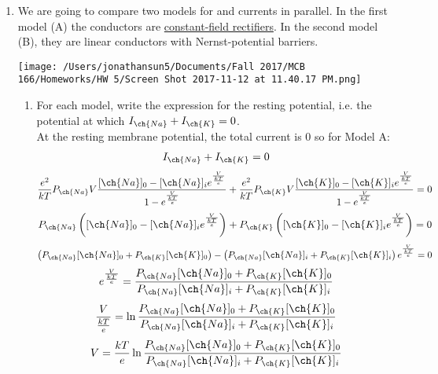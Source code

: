 \documentclass[11pt]{article}
\begin{document}
\begin{enumerate}[label=\arabic*.]
\newpage
\item
We are going to compare two models for  and  currents in parallel. In the first model (A) the conductors are \underline{constant-field rectifiers}. In the second model (B), they are linear conductors with Nernst-potential barriers.
\begin{center}
\texttt{[image: /Users/jonathansun5/Documents/Fall 2017/MCB 166/Homeworks/HW 5/Screen Shot 2017-11-12 at 11.40.17 PM.png]}
\end{center}
\begin{enumerate}[label=(\alph*)]
\item
For each model, write the expression for the resting potential, i.e. the potential at which $I_{\ch{Na}} + I_{\ch{K}} = 0$.
\vspace*{1\baselineskip}
\\
At the resting membrane potential, the total current is $0$ so for Model A:
\begin{align*}
I_{\ch{Na}} + I_{\ch{K}} = 0
\end{align*}
\begin{align*}
\frac{e^2} {kT} P_{\ch{Na}} V \frac{[\ch{Na}]_0 - [\ch{Na}]_i e^{\frac{V} {\frac{kT} {e}}}} {1 - e^{\frac{V} {\frac{kT} {e}}}} + \frac{e^2} {kT} P_{\ch{K}} V \frac{[\ch{K}]_0 - [\ch{K}]_i e^{\frac{V} {\frac{kT} {e}}}} {1 - e^{\frac{V} {\frac{kT} {e}}}} = 0
\end{align*}
\begin{align*}
P_{\ch{Na}} \left([\ch{Na}]_0 - [\ch{Na}]_i e^{\frac{V} {\frac{kT} {e}}}\right) + P_{\ch{K}} \left([\ch{K}]_0 - [\ch{K}]_i e^{\frac{V} {\frac{kT} {e}}}\right) = 0
\end{align*}
\begin{align*}
\left(P_{\ch{Na}} [\ch{Na}]_0 + P_{\ch{K}} [\ch{K}]_0\right) - \left(P_{\ch{Na}} [\ch{Na}]_i + P_{\ch{K}} [\ch{K}]_i\right) e^{\frac{V} {\frac{kT} {e}}} = 0
\end{align*}
\begin{align*}
e^{\frac{V} {\frac{kT} {e}}} = \frac{P_{\ch{Na}} [\ch{Na}]_0 + P_{\ch{K}} [\ch{K}]_0} {P_{\ch{Na}} [\ch{Na}]_i + P_{\ch{K}} [\ch{K}]_i}
\end{align*}
\begin{align*}
\frac{V} {\frac{kT} {e}} = \ln{\frac{P_{\ch{Na}} [\ch{Na}]_0 + P_{\ch{K}} [\ch{K}]_0} {P_{\ch{Na}} [\ch{Na}]_i + P_{\ch{K}} [\ch{K}]_i}}
\end{align*}
\begin{align*}
V = \frac{kT} {e} \ln{\frac{P_{\ch{Na}} [\ch{Na}]_0 + P_{\ch{K}} [\ch{K}]_0} {P_{\ch{Na}} [\ch{Na}]_i + P_{\ch{K}} [\ch{K}]_i}}

\end{align*}
\end{enumerate}
\end{enumerate}
\end{document}
